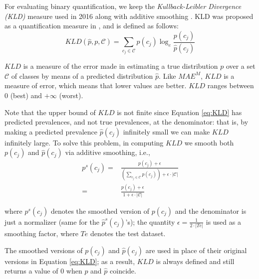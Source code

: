 \documentclass[11pt,a4paper]{article}
\begin{document}
For evaluating binary quantification, we keep the \emph{Kullback-Leibler Divergence} \textit{(KLD)} measure used in 2016 along with additive smoothing \cite{nakov-EtAl:2016:SemEval1,Forman:2005fk}. 
KLD was proposed as a quantification measure in \cite{Forman:2005fk}, and is
defined as follows:
%
\begin{equation}
  \label{eq:KLD}
  KLD(\hat{p},p,\mathcal{C}) = \sum_{c_{j}\in \mathcal{C}} 
  p(c_{j})\log_e\frac{p(c_{j})}{\hat{p}(c_{j})}
\end{equation}

$KLD$ is a measure of the error made in estimating a true
distribution $p$ over a set $\mathcal{C}$ of classes by means of a
predicted distribution $\hat{p}$. Like $MAE^{M}$, $KLD$ is a measure of error, which means that lower values are
better. $KLD$ ranges between 0 (best) and $+\infty$ (worst).

Note that the upper bound of $KLD$ is not finite since Equation
\ref{eq:KLD} has predicted prevalences, and not true prevalences, at
the denominator: that is, by making a predicted prevalence
$\hat{p}(c_{j})$ infinitely small we can make $KLD$ infinitely large.
To solve this problem, in computing $KLD$ we smooth both $p(c_{j})$
and $\hat{p}(c_{j})$ via additive smoothing, i.e.,
%
\begin{equation}
  \begin{aligned}
    \label{eq:smoothing}
    p^{s}(c_{j})= &
    \frac{p(c_{j})+\epsilon}{(\displaystyle\sum_{c_{j}\in
    \mathcal{C}}p(c_{j}))+\epsilon\cdot|\mathcal{C}|} \\ = &
    \frac{p(c_{j})+\epsilon}{1+\epsilon\cdot|\mathcal{C}|}
  \end{aligned}
\end{equation}

%
\noindent where $p^{s}(c_{j})$ denotes the smoothed version of
$p(c_{j})$ and the denominator is just a normalizer (same for
the $\hat{p}^{s}(c_{j})$'s); the quantity $\epsilon=\frac{1}{2\cdot
|Te|}$ is used as a smoothing factor, where $Te$ denotes the test dataset.

The smoothed versions of $p(c_{j})$ and $\hat{p}(c_{j})$ are used
in place of their original versions in Equation \ref{eq:KLD}; as a
result, $KLD$ is always defined and still returns a value of 0 when
$p$ and $\hat{p}$ coincide.
\end{document}
